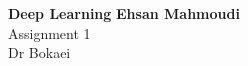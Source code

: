 \documentclass[a4paper, 11pt, fleqn]{article}
\begin{document}
\noindent
\large\textbf{Deep Learning} \hfill \textbf{Ehsan Mahmoudi} \\
\normalsize Assignment 1 \hfill   \\
Dr Bokaei \hfill  \\




\end{document}
